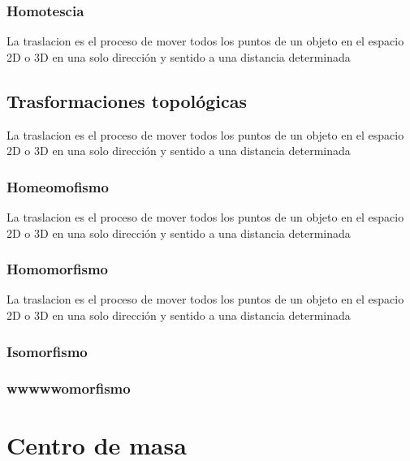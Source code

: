 \documentclass[
  16pt,
]{krantz}
\theoremstyle{definition}
\theoremstyle{definition}
\theoremstyle{definition}
\theoremstyle{definition}
\theoremstyle{remark}
\begin{document}
\hypertarget{homotescia}{%
\subsection{Homotescia}\label{homotescia}}

La traslacion es el proceso de mover todos los puntos de un objeto en el espacio 2D o 3D en una solo dirección y sentido a una distancia determinada

\hypertarget{trasformaciones-topoluxf3gicas}{%
\section{Trasformaciones topológicas}\label{trasformaciones-topoluxf3gicas}}

La traslacion es el proceso de mover todos los puntos de un objeto en el espacio 2D o 3D en una solo dirección y sentido a una distancia determinada

\hypertarget{homeomofismo}{%
\subsection{Homeomofismo}\label{homeomofismo}}

La traslacion es el proceso de mover todos los puntos de un objeto en el espacio 2D o 3D en una solo dirección y sentido a una distancia determinada

\hypertarget{homomorfismo}{%
\subsection{Homomorfismo}\label{homomorfismo}}

La traslacion es el proceso de mover todos los puntos de un objeto en el espacio 2D o 3D en una solo dirección y sentido a una distancia determinada \citep{xie2015}

\hypertarget{isomorfismo}{%
\subsection{Isomorfismo}\label{isomorfismo}}

\hypertarget{wwwwwomorfismo}{%
\subsection{wwwwwomorfismo}\label{wwwwwomorfismo}}

\hypertarget{centro-de-masa}{%
\chapter{Centro de masa}\label{centro-de-masa}}
\end{document}
